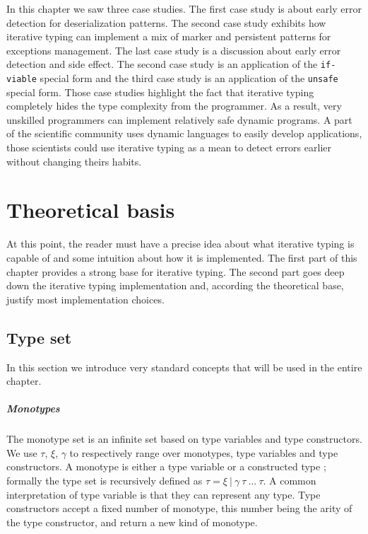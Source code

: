 \documentclass[a4paper]{report}
\newcommand{\ischeme}[1]{\colorbox{white}{\lstinline[language=scheme]&#1&}} %
\begin{document}
In this chapter we saw three case studies. The first case study is about early error detection for deserialization patterns. The second case study exhibits how iterative typing can implement a mix of marker and persistent patterns for exceptions management. The last case study is a discussion about early error detection and side effect. The second case study is an application of the \ischeme{if-viable} special form and the third case study is an application of the \ischeme{unsafe} special form. Those case studies highlight the fact that iterative typing completely hides the type complexity from the programmer. As a result, very unskilled programmers can implement relatively safe dynamic programs. A part of the scientific community uses dynamic languages to easily develop applications, those scientists could use iterative typing as a mean to detect errors earlier without changing theirs habits.

\chapter{Theoretical basis\label{ch_theory}}

At this point, the reader must have a precise idea about what iterative typing is capable of and some intuition about how it is implemented. The first part of this chapter provides a strong base for iterative typing. The second part goes deep down the iterative typing implementation and, according the theoretical base, justify most implementation choices.

\section{Type set}

In this section we introduce very standard concepts \cite{hm1}\cite{grad1}\cite{soft1} that will be used in the entire chapter.

\paragraph{Monotypes} The monotype set is an infinite set based on type variables and type constructors. We use $\tau$, $\xi$, $\gamma$ to respectively range over monotypes, type variables and type constructors. A monotype is either a type variable or a constructed type ; formally the type set is recursively defined as $\tau = \xi\ |\ \gamma\ \tau\ \ldots\ \tau$. A common interpretation of type variable is that they can represent any type. Type constructors accept a fixed number of monotype, this number being the arity of the type constructor, and return a new kind of monotype.
\end{document}

